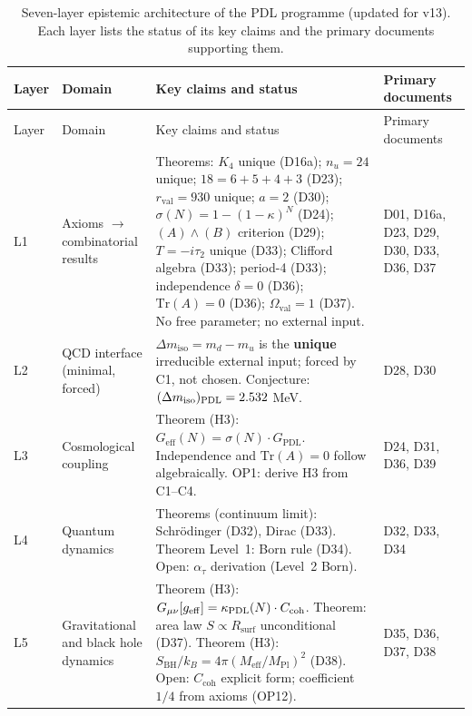 \documentclass[11pt,a4paper]{article}
\theoremstyle{plain}
\theoremstyle{definition}
\theoremstyle{remark}
\newcommand{\PDL}{\textnormal{PDL}}
\newcommand{\Kfour}{K_4}
\newcommand{\Geff}{G_{\mathrm{eff}}}
\newcommand{\GPDL}{G_{\mathrm{PDL}}}
\newcommand{\rval}{r_{\mathrm{val}}}
\newcommand{\Rsurf}{R_{\mathrm{surf}}}
\newcommand{\sigmaN}{\sigma(N)}
\newcommand{\SBH}{S_{\mathrm{BH}}}
\newcommand{\Meff}{M_{\mathrm{eff}}}
\newcommand{\MPl}{M_{\mathrm{Pl}}}
\begin{document}
\begin{longtable}{@{}L{0.6cm}L{3.0cm}L{5.5cm}L{4.0cm}@{}}
\caption{Seven-layer epistemic architecture of the PDL programme (updated for v13). Each layer lists the status of its key claims and the primary documents supporting them.}
\label{tab:epistemic}\\
\toprule
Layer & Domain & Key claims and status & Primary documents \\
\midrule
\endfirsthead
\toprule
Layer & Domain & Key claims and status & Primary documents \\
\midrule
\endhead
\bottomrule
\endfoot

L1 & Axioms $\to$ combinatorial results &
\textcolor{proofblue}{Theorems}: $\Kfour$ unique (D16a); $n_u=24$ unique; $18=6+5+4+3$ (D23); $\rval=930$ unique; $a=2$ (D30); $\sigma(N)=1-(1-\kappa)^N$ (D24); $(A)\wedge(B)$ criterion (D29); $T=-i\tau_2$ unique (D33); Clifford algebra (D33); period-4 (D33); independence $\delta=0$ (D36); $\mathrm{Tr}(A)=0$ (D36); $\Omega_{\mathrm{val}}=1$ (D37).
No free parameter; no external input. &
D01, D16a, D23, D29, D30, D33, D36, D37 \\[0.4em]

L2 & QCD interface (minimal, forced) &
$\Delta m_{\mathrm{iso}} = m_d - m_u$ is the \textbf{unique} irreducible external input; forced by C1, not chosen.
\textcolor{conjecturegreen}{Conjecture}: $(\Delta m_{\mathrm{iso}})_{\PDL}=2.532$ MeV. &
D28, D30 \\[0.4em]

L3 & Cosmological coupling &
\textcolor{proofblue}{Theorem (H3)}: $\Geff(N)=\sigmaN\cdot\GPDL$.
Independence and $\mathrm{Tr}(A)=0$ follow algebraically.
\textcolor{openproblemred}{OP1}: derive H3 from C1--C4. &
D24, D31, D36, D39 \\[0.4em]

L4 & Quantum dynamics &
\textcolor{proofblue}{Theorems} (continuum limit): Schr\"odinger (D32), Dirac (D33).
\textcolor{proofblue}{Theorem Level~1}: Born rule (D34).
\textcolor{openproblemred}{Open}: $\alpha_\tau$ derivation (Level~2 Born). &
D32, D33, D34 \\[0.4em]

L5 & Gravitational and black hole dynamics &
\textcolor{proofblue}{Theorem (H3)}: $G_{\mu\nu}[g_{\mathrm{eff}}]=\kappa_{\PDL}(N)\cdot C_{\mathrm{coh}}$.
\textcolor{proofblue}{Theorem}: area law $S\propto\Rsurf$ unconditional (D37).
\textcolor{proofblue}{Theorem (H3)}: $\SBH/k_B=4\pi(\Meff/\MPl)^2$ (D38).
\textcolor{openproblemred}{Open}: $C_{\mathrm{coh}}$ explicit form; coefficient $1/4$ from axioms (OP12). &
D35, D36, D37, D38 \\[0.4em]


\end{longtable}
\end{document}
